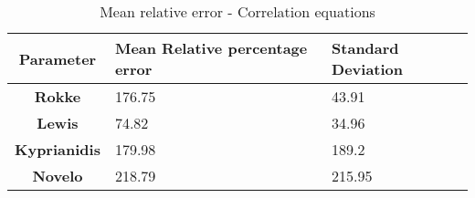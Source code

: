 \begin{table}[h!]
  \centering
  \begin{tabularx}{\textwidth}{||c|X|X||}
  \hline
    \cellcolor{gray!20}\textbf{Parameter} & \cellcolor{gray!20}\textbf{Mean Relative percentage error} & \cellcolor{gray!20}\textbf{Standard Deviation} \\ [0.5ex]
  \hline\hline
\centering
    \cellcolor{gray!20}\textbf{Rokke} & 176.75 & 43.91 \\
  \hline
    \cellcolor{gray!20}\textbf{Lewis} & 74.82 & 34.96 \\
  \hline
    \cellcolor{gray!20}\textbf{Kyprianidis} & 179.98 & 189.2 \\
  \hline
    \cellcolor{gray!20}\textbf{Novelo} & 218.79 & 215.95 \\
  \hline
  \end{tabularx}
  \caption{Mean relative error - Correlation equations}
  \label{meanEC}
\end{table}
